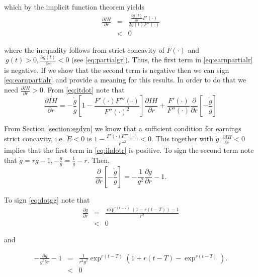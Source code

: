 \noindent which by the implicit function theorem yields
\begin{eqnarray}
\frac{\partial IH}{\partial r} &=& \frac{\frac{\partial g(t)}{\partial r} F'(\cdot)}{2 g(t) F''(\cdot)} \nonumber \\ 
&<& 0
\end{eqnarray}

\noindent where the inequality follows from strict concavity of $F(\cdot)$ and  $\ g(t) > 0, \frac{\partial g(t)}{ \partial r} <0$ (see \eqref{eq:partialgr}). Thus, the first term in \eqref{eq:earnpartialr} is negative. If we show that the second term is negative then we can sign \eqref{eq:earnpartialr} and provide a meaning for this results. In order to do that we need $\frac{\partial \dot{IH}}{\partial r} > 0$. From \eqref{eq:itdot} note that 
\begin{equation}
\frac{\partial \dot{IH}}{\partial r} = -\frac{\dot{g}}{g} \left[ 1 - \frac{F'(\cdot)F'''(\cdot)}{{F''(\cdot)}^2}\right] \frac{\partial IH}{\partial r} + \frac{F'(\cdot)}{F''(\cdot)}\frac{\partial}{\partial r} \left[ - \frac{\dot{g}}{g} \right] \label{eq:ihdotr}
\end{equation}

\indent From Section \ref{section:egdyn} we know that a sufficient condition for earnings strict concavity, i.e. $\ddot{E} < 0$ is $1 - \frac{F'(\cdot) F'''(\cdot)}{{F''}^2} < 0$. This together with $\dot{g}, \frac{\partial IH}{\partial r} < 0$ implies that the first term in \eqref{eq:ihdotr} is positive. To sign the second term note that $\dot{g} = rg - 1, - \frac{\dot{g}}{g} = \frac{1}{g} - r$. Then,
\begin{equation}
\frac{\partial}{\partial r} \left[ - \frac{\dot{g}}{g} \right] = - \frac{1}{g^2} \frac{\partial g}{\partial r} - 1. \label{eq:dotgg}
\end{equation}

\indent To sign \eqref{eq:dotgg} note that
\begin{eqnarray}
\frac{\partial g}{\partial r} &=& \frac{\exp^{r(t-T)} \left( 1 - r(t - T) \right) - 1 }{r^2} \nonumber \\
&<& 0 \label{eq:partialgr}
\end{eqnarray}

\noindent and

\begin{eqnarray}
- \frac{\partial g }{g^2 \partial r} - 1 &=& \frac{1}{r^2g^2} \exp^{r(t-T)} \left( 1 + r(t - T) - \exp^{r(t-T)} \right). \nonumber \\
&<& 0
\end{eqnarray}

